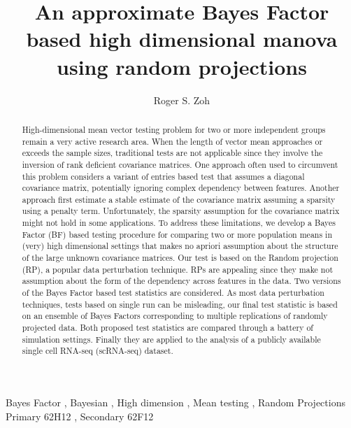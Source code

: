 \documentclass[times,sort&compress,3p]{elsarticle}
\theoremstyle{plain}%
\theoremstyle{definition}
\begin{document}
\begin{frontmatter}

\title{An approximate Bayes Factor based high dimensional manova using random projections}

\author[1]{Roger S. Zoh }

\address[1]{Department of Epidemiology \& Biostatistics Indiana University, Bloomington, IN 47405, USA}


\begin{abstract}
High-dimensional mean vector testing problem for two or more independent groups remain a very active research area. When the length of vector mean approaches or exceeds the sample sizes, traditional tests are not applicable since they involve the inversion of rank deficient covariance matrices. One approach often used to circumvent this problem considers a variant of entries based test that assumes a diagonal covariance matrix, potentially ignoring complex dependency between features. Another approach first estimate a stable estimate of the covariance matrix assuming a sparsity using a penalty term. Unfortunately, the sparsity assumption for the covariance matrix might not hold in some applications.   
To address these limitations, we develop a Bayes Factor (BF) based testing procedure for comparing two or more population means in (very) high dimensional settings that makes no apriori assumption about the structure of the large unknown covariance matrices. Our test is based on the Random projection (RP), a popular data perturbation technique. RPs are appealing since they make not assumption about the form of the dependency across features in the data. Two versions of the Bayes Factor based test statistics are considered. As most data perturbation techniques, tests based on single run can be misleading, our  final test statistic is based on an ensemble of Bayes Factors corresponding to multiple replications of randomly projected data. Both proposed test statistics are compared through a battery of simulation settings. Finally they are applied to the analysis of a publicly available single cell RNA-seq (scRNA-seq) dataset. 
\end{abstract}

\begin{keyword} %
Bayes Factor \sep
Bayesian \sep
High dimension \sep
Mean testing \sep
Random Projections 
\MSC[2020] Primary 62H12 \sep
Secondary 62F12
\end{keyword}

\end{frontmatter}
\end{document}
